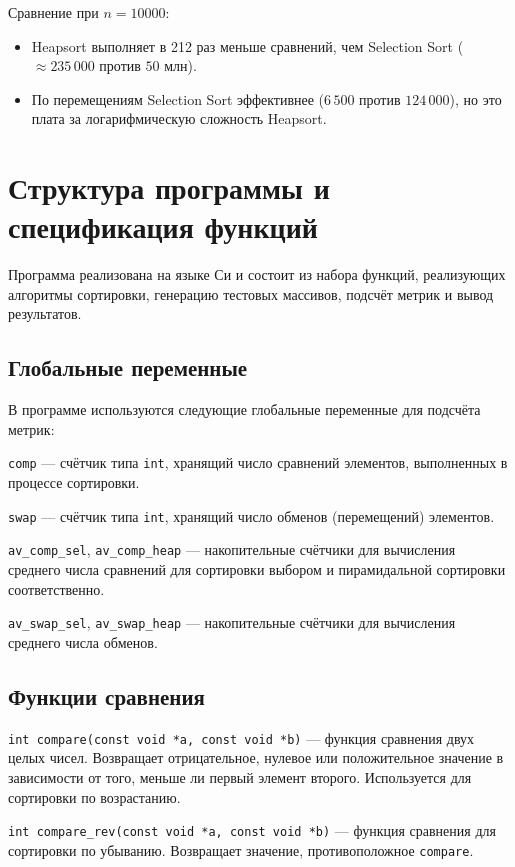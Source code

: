 \documentclass[a4paper,12pt,titlepage,finall]{article}
\begin{document}
Сравнение при $n=10000$:
\begin{itemize}
\item Heapsort выполняет в 212 раз меньше сравнений, чем Selection Sort ($\approx 235\,000$ против $50$ млн).
\item По перемещениям Selection Sort эффективнее ($6\,500$ против $124\,000$), но это плата за логарифмическую сложность Heapsort.
\end{itemize}


\newpage

\section{Структура программы и спецификация функций}

Программа реализована на языке Си и состоит из набора функций, реализующих алгоритмы сортировки, генерацию тестовых массивов, подсчёт метрик и вывод результатов.

\subsection{Глобальные переменные}

В программе используются следующие глобальные переменные для подсчёта метрик:

\texttt{comp} — счётчик типа \texttt{int}, хранящий число сравнений элементов, выполненных в процессе сортировки.

\texttt{swap} — счётчик типа \texttt{int}, хранящий число обменов (перемещений) элементов.

\texttt{av\_comp\_sel}, \texttt{av\_comp\_heap} — накопительные счётчики для вычисления среднего числа сравнений для сортировки выбором и пирамидальной сортировки соответственно.

\texttt{av\_swap\_sel}, \texttt{av\_swap\_heap} — накопительные счётчики для вычисления среднего числа обменов.

\subsection{Функции сравнения}

\texttt{int compare(const void *a, const void *b)} — функция сравнения двух целых чисел. Возвращает отрицательное, нулевое или положительное значение в зависимости от того, меньше ли первый элемент второго. Используется для сортировки по возрастанию.

\texttt{int compare\_rev(const void *a, const void *b)} — функция сравнения для сортировки по убыванию. Возвращает значение, противоположное \texttt{compare}.
\end{document}
